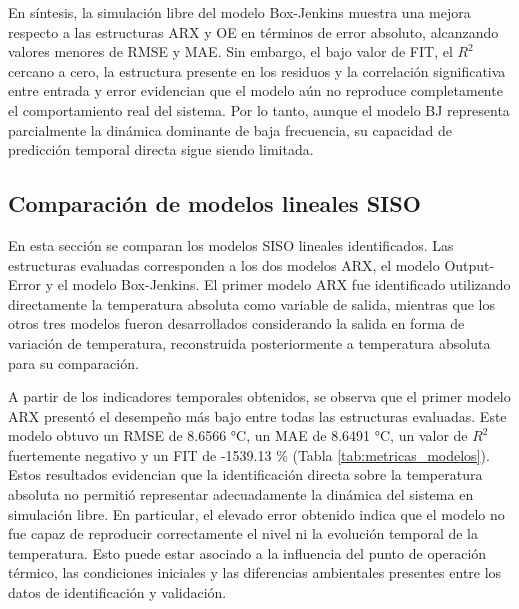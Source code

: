 \documentclass[11pt]{report}
\begin{document}
En síntesis, la simulación libre del modelo Box-Jenkins muestra una mejora respecto a las estructuras ARX y OE en términos de error absoluto, alcanzando valores menores de RMSE y MAE. Sin embargo, el bajo valor de FIT, el $R^2$ cercano a cero, la estructura presente en los residuos y la correlación significativa entre entrada y error evidencian que el modelo aún no reproduce completamente el comportamiento real del sistema. Por lo tanto, aunque el modelo BJ representa parcialmente la dinámica dominante de baja frecuencia, su capacidad de predicción temporal directa sigue siendo limitada.

\subsection{Comparación de modelos lineales SISO}

En esta sección se comparan los modelos SISO lineales identificados. Las estructuras evaluadas corresponden a los dos modelos ARX, el modelo Output-Error y el modelo Box-Jenkins.
El primer modelo ARX fue identificado utilizando directamente la temperatura absoluta como variable de salida, mientras que los otros tres modelos fueron desarrollados considerando la salida en forma de variación de temperatura, reconstruida posteriormente a temperatura absoluta para su comparación.

A partir de los indicadores temporales obtenidos, se observa que el primer modelo ARX presentó el desempeño más bajo entre todas las estructuras evaluadas. Este modelo obtuvo un RMSE de 8.6566 °C, un MAE de 8.6491 °C, un valor de $R^2$ fuertemente negativo y un FIT de -1539.13 \% (Tabla \ref{tab:metricas_modelos}). Estos resultados evidencian que la identificación directa sobre la temperatura absoluta no permitió representar adecuadamente la dinámica del sistema en simulación libre. En particular, el elevado error obtenido indica que el modelo no fue capaz de reproducir correctamente el nivel ni la evolución temporal de la temperatura. Esto puede estar asociado a la influencia del punto de operación térmico, las condiciones iniciales y las diferencias ambientales presentes entre los datos de identificación y validación.
\end{document}
